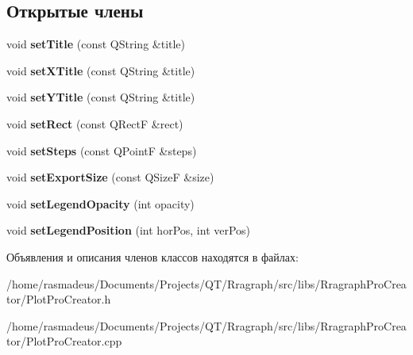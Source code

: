 \subsection*{Открытые члены}
\begin{DoxyCompactItemize}
\item 
\hypertarget{classPlotProCreator_ab314b6a6b180c598d1b64e5c5c4d7a70}{void {\bfseries set\-Title} (const \-Q\-String \&title)}\label{classPlotProCreator_ab314b6a6b180c598d1b64e5c5c4d7a70}

\item 
\hypertarget{classPlotProCreator_abae4f2c2ffe78d3c5ddf5d67a35af6aa}{void {\bfseries set\-X\-Title} (const \-Q\-String \&title)}\label{classPlotProCreator_abae4f2c2ffe78d3c5ddf5d67a35af6aa}

\item 
\hypertarget{classPlotProCreator_aa44ab8fb1b26f8ae88c4053a22692301}{void {\bfseries set\-Y\-Title} (const \-Q\-String \&title)}\label{classPlotProCreator_aa44ab8fb1b26f8ae88c4053a22692301}

\item 
\hypertarget{classPlotProCreator_a6df2c1f23d486f06fe5f41f316ed33c5}{void {\bfseries set\-Rect} (const \-Q\-Rect\-F \&rect)}\label{classPlotProCreator_a6df2c1f23d486f06fe5f41f316ed33c5}

\item 
\hypertarget{classPlotProCreator_a84522e991e8465ba8dce3084eac02ddc}{void {\bfseries set\-Steps} (const \-Q\-Point\-F \&steps)}\label{classPlotProCreator_a84522e991e8465ba8dce3084eac02ddc}

\item 
\hypertarget{classPlotProCreator_a9ac8966ef4f9753ef4da56e55c6f812b}{void {\bfseries set\-Export\-Size} (const \-Q\-Size\-F \&size)}\label{classPlotProCreator_a9ac8966ef4f9753ef4da56e55c6f812b}

\item 
\hypertarget{classPlotProCreator_aabbac7119f882dd12d5efc06d3e3a7f8}{void {\bfseries set\-Legend\-Opacity} (int opacity)}\label{classPlotProCreator_aabbac7119f882dd12d5efc06d3e3a7f8}

\item 
\hypertarget{classPlotProCreator_aac9f94da42427bc4b1f121679fc1142a}{void {\bfseries set\-Legend\-Position} (int hor\-Pos, int ver\-Pos)}\label{classPlotProCreator_aac9f94da42427bc4b1f121679fc1142a}

\end{DoxyCompactItemize}


Объявления и описания членов классов находятся в файлах\-:\begin{DoxyCompactItemize}
\item 
/home/rasmadeus/\-Documents/\-Projects/\-Q\-T/\-Rragraph/src/libs/\-Rragraph\-Pro\-Creator/\-Plot\-Pro\-Creator.\-h\item 
/home/rasmadeus/\-Documents/\-Projects/\-Q\-T/\-Rragraph/src/libs/\-Rragraph\-Pro\-Creator/\-Plot\-Pro\-Creator.\-cpp\end{DoxyCompactItemize}
